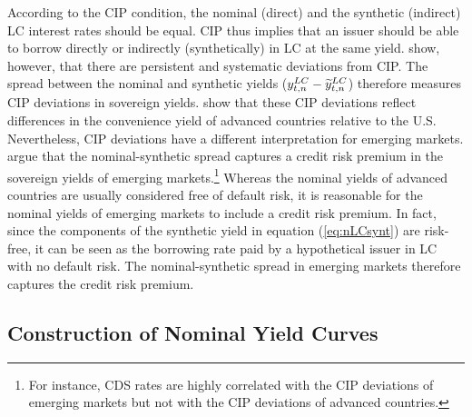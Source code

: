 {According to the CIP condition, the nominal (direct) and the synthetic (indirect) LC interest rates should be equal. 
CIP thus implies that an 
issuer should be able to borrow directly or indirectly (synthetically) in LC at the same yield. 
\cite*{DuTepperVerdelhan:2018} show, however, that there are persistent and systematic deviations from CIP. 
The spread between the nominal and synthetic yields ($y_{t,n} ^{LC} - \widetilde{y}_{t,n} ^{LC}$) therefore measures CIP deviations in sovereign yields.
\cite*{DuImSchreger:2018JIE} show that these CIP deviations reflect differences in the convenience yield of advanced countries relative to the U.S.
Nevertheless, CIP deviations have a different interpretation for emerging markets. \cite{DuSchreger:2016JoF} argue that the nominal-synthetic spread captures a credit risk premium in the sovereign yields of emerging markets.\footnote{ For instance, CDS rates are highly correlated with the CIP deviations of emerging markets but not with the CIP deviations of advanced countries.}
Whereas the nominal yields of advanced countries are usually considered free of default risk, it is reasonable for the nominal yields of emerging markets to include a credit risk premium.
In fact, since the components of the synthetic yield in equation (\ref{eq:nLCsynt}) are risk-free, it can be seen as the borrowing rate paid by a hypothetical issuer in LC with no default risk. 
The nominal-synthetic spread in emerging markets therefore captures the credit risk premium.



\subsection{Construction of Nominal Yield Curves} \label{sec:YCnom}
\iftoggle{toclinks}{\gototoc}{} %

}

